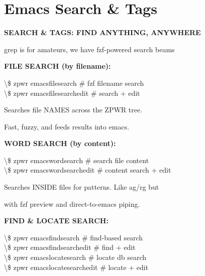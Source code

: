 \documentclass[11pt,a4paper,twoside]{book}
\begin{document}
\vspace{16pt}

\section{Emacs Search \& Tags}


\vspace{10pt}
{\large\bfseries\color{neoncyan} SEARCH \& TAGS: FIND ANYTHING, ANYWHERE}\vspace{6pt}

grep is for amateurs, we have fzf-powered search beams


\vspace{12pt}
{\bfseries\color{neonyellow} FILE SEARCH (by filename):}\vspace{4pt}

\begin{codebox}
\textbackslash{}\$ zpwr emacsfilesearch        \# fzf filename search\\
\textbackslash{}\$ zpwr emacsfilesearchedit    \# search + edit\\
\end{codebox}

Searches file NAMES across the ZPWR tree.

Fast, fuzzy, and feeds results into emacs.


\vspace{12pt}
{\bfseries\color{neonyellow} WORD SEARCH (by content):}\vspace{4pt}

\begin{codebox}
\textbackslash{}\$ zpwr emacswordsearch        \# search file content\\
\textbackslash{}\$ zpwr emacswordsearchedit    \# content search + edit\\
\end{codebox}

Searches INSIDE files for patterns. Like ag/rg but

with fzf preview and direct-to-emacs piping.


\vspace{12pt}
{\bfseries\color{neonyellow} FIND \& LOCATE SEARCH:}\vspace{4pt}

\begin{codebox}
\textbackslash{}\$ zpwr emacsfindsearch        \# find-based search\\
\textbackslash{}\$ zpwr emacsfindsearchedit    \# find + edit\\
\textbackslash{}\$ zpwr emacslocatesearch      \# locate db search\\
\textbackslash{}\$ zpwr emacslocatesearchedit  \# locate + edit\\
\end{codebox}
\end{document}
